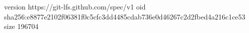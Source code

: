 version https://git-lfs.github.com/spec/v1
oid sha256:e8877e2102f06381f0c5cfc3dd4485cdab736e0d46267c2d2fbed4a216c1ce53
size 196704

